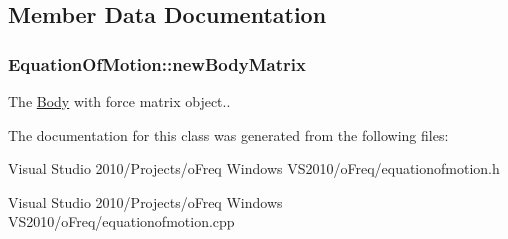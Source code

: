 \subsection{Member Data Documentation}
\hypertarget{class_equation_of_motion_aef744ed7692bf6186bb976e0d53f972f}{
\subsubsection[{new\-Body\-Matrix}]{ Equation\-Of\-Motion\-::new\-Body\-Matrix}}\label{class_equation_of_motion_aef744ed7692bf6186bb976e0d53f972f}
The \hyperlink{class_body}{Body} with force matrix object.. 

The documentation for this class was generated from the following files\-:\begin{DoxyCompactItemize}
\item 
Visual Studio 2010/\-Projects/o\-Freq Windows V\-S2010/o\-Freq/equationofmotion.\-h\item 
Visual Studio 2010/\-Projects/o\-Freq Windows V\-S2010/o\-Freq/equationofmotion.\-cpp\end{DoxyCompactItemize}
